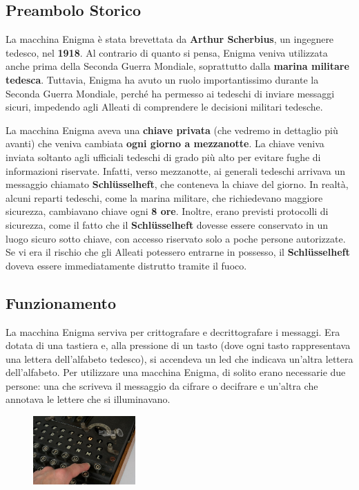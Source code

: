 \documentclass{rapport}
\begin{document}
\subsection{Preambolo Storico}

La macchina Enigma è stata brevettata da \textbf{Arthur Scherbius}, un ingegnere tedesco, nel \textbf{1918}. Al contrario di quanto si pensa, Enigma veniva utilizzata anche prima della Seconda Guerra Mondiale, soprattutto dalla \textbf{marina militare tedesca}. Tuttavia, Enigma ha avuto un ruolo importantissimo durante la Seconda Guerra Mondiale, perché ha permesso ai tedeschi di inviare messaggi sicuri, impedendo agli Alleati di comprendere le decisioni militari tedesche. 

La macchina Enigma aveva una \textbf{chiave privata} (che vedremo in dettaglio più avanti) che veniva cambiata \textbf{ogni giorno a mezzanotte}. La chiave veniva inviata soltanto agli ufficiali tedeschi di grado più alto per evitare fughe di informazioni riservate. Infatti, verso mezzanotte, ai generali tedeschi arrivava un messaggio chiamato \textbf{Schlüsselheft}, che conteneva la chiave del giorno. In realtà, alcuni reparti tedeschi, come la marina militare, che richiedevano maggiore sicurezza, cambiavano chiave ogni \textbf{8 ore}. Inoltre, erano previsti protocolli di sicurezza, come il fatto che il \textbf{Schlüsselheft} dovesse essere conservato in un luogo sicuro sotto chiave, con accesso riservato solo a poche persone autorizzate. Se vi era il rischio che gli Alleati potessero entrarne in possesso, il \textbf{Schlüsselheft} doveva essere immediatamente distrutto tramite il fuoco.

\subsection{Funzionamento}

La macchina Enigma serviva per crittografare e decrittografare i messaggi. Era dotata di una tastiera e, alla pressione di un tasto (dove ogni tasto rappresentava una lettera dell'alfabeto tedesco), si accendeva un led che indicava un'altra lettera dell'alfabeto. Per utilizzare una macchina Enigma, di solito erano necessarie due persone: una che scriveva il messaggio da cifrare o decifrare e un'altra che annotava le lettere che si illuminavano.

\begin{figure}
    \centering
    \vspace{-1.5cm}
    \includegraphics[width=0.35\textwidth]{logos/2_2cripto.jpg}
\end{figure}
\end{document}
